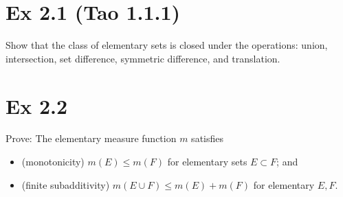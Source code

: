 \documentclass{article}
\begin{document}
\section{Ex 2.1 (Tao 1.1.1)}
 Show that the class of elementary sets is closed under the operations: union, intersection, set difference, symmetric difference, and translation.
 
 \section{Ex 2.2}
Prove: The elementary measure function $m$ satisfies
  \begin{itemize}
  \item (monotonicity) $m(E)\leq m(F)$ for elementary sets $E\subset F$; and
  \item (finite subadditivity) $m(E\cup F)\leq m(E)+m(F)$ for elementary $E,F$.
\end{itemize}
\end{document}
